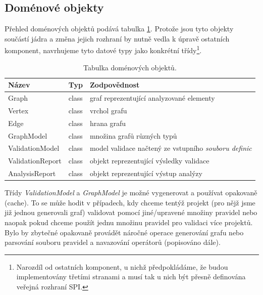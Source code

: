 \subsection{Doménové objekty}
\label{design-domain_objects}

Přehled doménových objektů podává tabulka \ref{design-domain_object_table}. Protože jsou tyto objekty součástí jádra a změna jejich rozhraní by nutně vedla k úpravě ostatních komponent, navrhujeme tyto datové typy jako konkrétní třídy\footnote{Narozdíl od ostatních komponent, u nichž předpokládáme, že budou implementovány třetími stranami a musí tak u nich být přesně definována veřejná rozhraní SPI.}.

\begin{table}[h]
  \caption{Tabulka doménových objektů. \label{design-domain_object_table}}
  \begin{center}
    \begin{tabular}{| l | c | p{8cm} |}
      \hline
      \textbf{Název} & \textbf{Typ} & \textbf{Zodpovědnost} \\
      \hline
      Graph & class & graf reprezentující analyzované elementy \\ \hline
      Vertex & class &  vrchol grafu \\ \hline
      Edge & class & hrana grafu \\ \hline
      GraphModel & class & množina grafů různých typů \\ \hline
      ValidationModel & class & model validace načtený ze vstupního \emph{souboru definic} \\ \hline
      ValidationReport & class &  objekt reprezentující výsledky validace\\ \hline
      AnalysisReport & class & objekt reprezentující výstup analýzy \\ \hline
    \end{tabular}
  \end{center}

\end{table}

Třídy \emph{ValidationModel} a \emph{GraphModel} je možné vygenerovat a používat opakovaně (cache). To se může hodit v případech, kdy chceme tentýž projekt (pro nějž jsme již jednou generovali graf) validovat pomocí jiné/upravené množiny pravidel nebo naopak pokud chceme použít jednu množinu pravidel pro validaci více projektů. Bylo by zbytečné opakovaně provádět náročné operace generování grafu nebo parsování souboru pravidel a navazování operátorů (popisováno dále).

